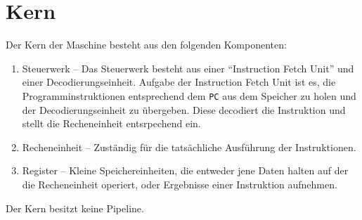 \section{Kern}
\label{sec:Kern}

Der Kern der Maschine besteht aus den folgenden Komponenten:

\begin{enumerate}
  \item Steuerwerk --
   Das Steuerwerk besteht aus einer ``Instruction Fetch Unit'' und einer
   Decodierungseinheit. Aufgabe der Instruction Fetch Unit ist es, die
   Programminstruktionen entsprechend dem \texttt{PC} aus dem Speicher zu holen
   und der Decodierungseinheit zu übergeben. Diese decodiert die Instruktion und
   stellt die Recheneinheit entsrpechend ein.
  \item Recheneinheit --
   Zuständig für die tatsächliche Ausführung der Instruktionen. 
  \item Register --
   Kleine Speichereinheiten, die entweder jene Daten halten auf der die Recheneinheit
   operiert, oder Ergebnisse einer Instruktion aufnehmen.
\end{enumerate}

Der Kern besitzt keine Pipeline.
